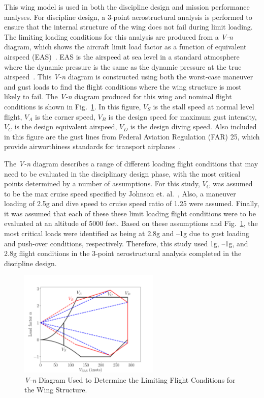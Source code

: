 This wing model is used in both the discipline design and mission performance analyses.
For discipline design, a 3-point aerostructural analysis is performed to ensure that the internal structure of the wing does not fail during limit loading.
The limiting loading conditions for this analysis are produced from a \textit{V-n} diagram, which shows the aircraft limit load factor as a function of equivalent airspeed (EAS)~\cite{Raymer2012}.
EAS is the airspeed at sea level in a standard atmosphere where the dynamic pressure is the same as the dynamic pressure at the true airspeed~\cite{Raymer2012}.
This \textit{V-n} diagram is constructed using both the worst-case maneuver and gust loads to find the flight conditions where the wing structure is most likely to fail.
The \textit{V-n} diagram produced for this wing and nominal flight conditions is shown in Fig.~\ref{f:v_n_diagram}.
In this figure, $V_S$ is the stall speed at normal level flight, $V_A$ is the corner speed, $V_B$ is the design speed for maximum gust intensity, $V_C$ is the design equivalent airspeed, $V_D$ is the design diving speed.
Also included in this figure are the gust lines from Federal Aviation Regulation (FAR) 25, which provide airworthiness standards for transport airplanes~\cite{far25}.

The \textit{V-n} diagram describes a range of different loading flight conditions that may need to be evaluated in the disciplinary design phase, with the most critical points determined by a number of assumptions. 
For this study, $V_C$ was assumed to be the max cruise speed specified by Johnson et. al.~\cite{johnson2018concept},
Also, a maneuver loading of 2.5g and dive speed to cruise speed ratio of 1.25 were assumed.
Finally, it was assumed that each of these these limit loading flight conditions were to be evaluated at an altitude of 5000 feet.
Based on these assumptions and Fig.~\ref{f:v_n_diagram}, the most critical loads were identified as being at 2.8g and --1g due to gust loading and push-over conditions, respectively.
Therefore, this study used 1g, --1g, and 2.8g flight conditions in the 3-point aerostructural analysis completed in the discipline design.

\begin{figure}[htb]
\begin{center}
 \includegraphics[width=0.6\textwidth]{../Images/v_n_diagram}
 \caption{\textit{V-n} Diagram Used to Determine the Limiting Flight Conditions for the Wing Structure.}
 \label{f:v_n_diagram}
\end{center}
\end{figure}

